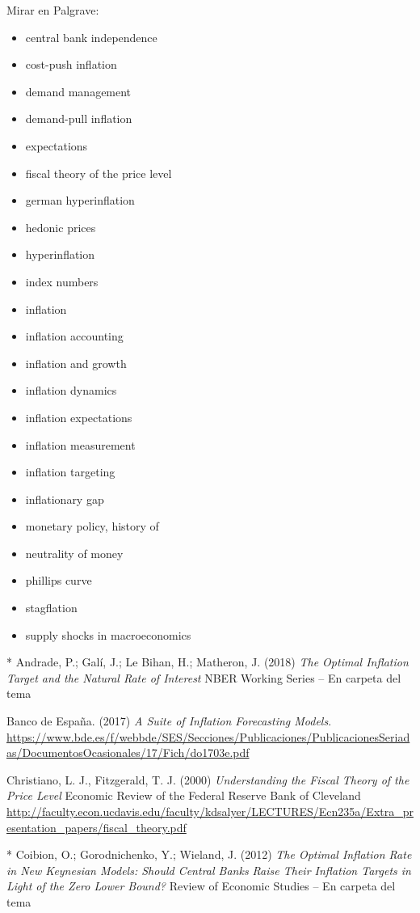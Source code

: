 \documentclass{nuevotema}
\begin{document}
\bibliografia

Mirar en Palgrave:
\begin{itemize}
	\item central bank independence
	\item cost-push inflation
	\item demand management
	\item demand-pull inflation
	\item expectations
	\item fiscal theory of the price level
	\item german hyperinflation
	\item hedonic prices
	\item hyperinflation
	\item index numbers
	\item inflation
	\item inflation accounting
	\item inflation and growth
	\item inflation dynamics
	\item inflation expectations
	\item inflation measurement
	\item inflation targeting
	\item inflationary gap
	\item monetary policy, history of
	\item neutrality of money
	\item phillips curve
	\item stagflation
	\item supply shocks in macroeconomics
\end{itemize}


* Andrade, P.; Galí, J.; Le Bihan, H.; Matheron, J. (2018) \textit{The Optimal Inflation Target and the Natural Rate of Interest} NBER Working Series -- En carpeta del tema

Banco de España. (2017) \textit{A Suite of Inflation Forecasting Models}.  \url{https://www.bde.es/f/webbde/SES/Secciones/Publicaciones/PublicacionesSeriadas/DocumentosOcasionales/17/Fich/do1703e.pdf}

Christiano, L. J., Fitzgerald, T. J. (2000) \textit{Understanding the Fiscal Theory of the Price Level} Economic Review of the Federal Reserve Bank of Cleveland  \url{http://faculty.econ.ucdavis.edu/faculty/kdsalyer/LECTURES/Ecn235a/Extra\_presentation\_papers/fiscal\_theory.pdf}

* Coibion, O.; Gorodnichenko, Y.; Wieland, J. (2012) \textit{The Optimal Inflation Rate in New Keynesian Models: Should Central Banks Raise Their Inflation Targets in Light of the Zero Lower Bound?} Review of Economic Studies -- En carpeta del tema
\end{document}
